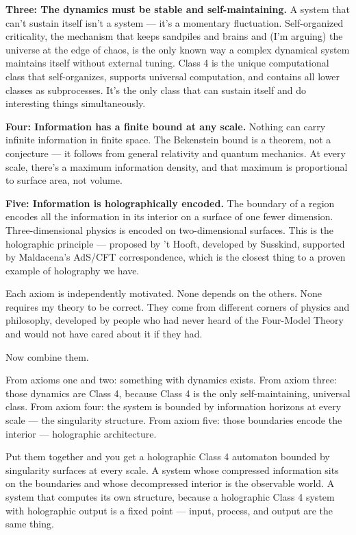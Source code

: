 \documentclass[11pt, twoside, openright]{book}
\begin{document}
\textbf{Three: The dynamics must be stable and self-maintaining.} A system that can't sustain itself isn't a system --- it's a momentary fluctuation. Self-organized criticality, the mechanism that keeps sandpiles and brains and (I'm arguing) the universe at the edge of chaos, is the only known way a complex dynamical system maintains itself without external tuning. Class 4 is the unique computational class that self-organizes, supports universal computation, and contains all lower classes as subprocesses. It's the only class that can sustain itself and do interesting things simultaneously.

\textbf{Four: Information has a finite bound at any scale.} Nothing can carry infinite information in finite space. The Bekenstein bound is a theorem, not a conjecture --- it follows from general relativity and quantum mechanics. At every scale, there's a maximum information density, and that maximum is proportional to surface area, not volume.

\textbf{Five: Information is holographically encoded.} The boundary of a region encodes all the information in its interior on a surface of one fewer dimension. Three-dimensional physics is encoded on two-dimensional surfaces. This is the holographic principle --- proposed by 't Hooft, developed by Susskind, supported by Maldacena's AdS/\allowbreak{}CFT correspondence, which is the closest thing to a proven example of holography we have.

Each axiom is independently motivated. None depends on the others. None requires my theory to be correct. They come from different corners of physics and philosophy, developed by people who had never heard of the Four-Model Theory and would not have cared about it if they had.

Now combine them.

From axioms one and two: something with dynamics exists. From axiom three: those dynamics are Class 4, because Class 4 is the only self-maintaining, universal class. From axiom four: the system is bounded by information horizons at every scale --- the singularity structure. From axiom five: those boundaries encode the interior --- holographic architecture.

Put them together and you get a holographic Class 4 automaton bounded by singularity surfaces at every scale. A system whose compressed information sits on the boundaries and whose decompressed interior is the observable world. A system that computes its own structure, because a holographic Class 4 system with holographic output is a fixed point --- input, process, and output are the same thing.
\end{document}
